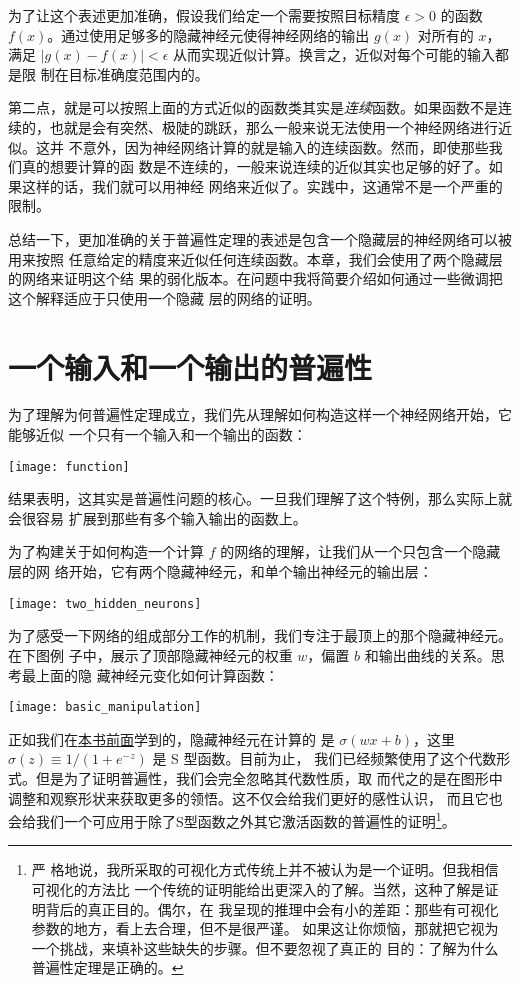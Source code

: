 为了让这个表述更加准确，假设我们给定一个需要按照目标精度 $\epsilon > 0$ 的函数
$f(x)$。通过使用足够多的隐藏神经元使得神经网络的输出 $g(x)$ 对所有的 $x$，满足
$|g(x) - f(x)| < \epsilon$ 从而实现近似计算。换言之，近似对每个可能的输入都是限
制在目标准确度范围内的。

第二点，就是可以按照上面的方式近似的函数类其实是\emph{连续}函数。如果函数不是连
续的，也就是会有突然、极陡的跳跃，那么一般来说无法使用一个神经网络进行近似。这并
不意外，因为神经网络计算的就是输入的连续函数。然而，即使那些我们真的想要计算的函
数是不连续的，一般来说连续的近似其实也足够的好了。如果这样的话，我们就可以用神经
网络来近似了。实践中，这通常不是一个严重的限制。

总结一下，更加准确的关于普遍性定理的表述是包含一个隐藏层的神经网络可以被用来按照
任意给定的精度来近似任何连续函数。本章，我们会使用了两个隐藏层的网络来证明这个结
果的弱化版本。在问题中我将简要介绍如何通过一些微调把这个解释适应于只使用一个隐藏
层的网络的证明。

\section{一个输入和一个输出的普遍性}
\label{sec:universality_with_one_input_and_one_output}

为了理解为何普遍性定理成立，我们先从理解如何构造这样一个神经网络开始，它能够近似
一个只有一个输入和一个输出的函数：
\begin{center}
  \texttt{[image: function]}
\end{center}

结果表明，这其实是普遍性问题的核心。一旦我们理解了这个特例，那么实际上就会很容易
扩展到那些有多个输入输出的函数上。

为了构建关于如何构造一个计算 $f$ 的网络的理解，让我们从一个只包含一个隐藏层的网
络开始，它有两个隐藏神经元，和单个输出神经元的输出层：
\begin{center}
  \texttt{[image: two\_hidden\_neurons]}
\end{center}

为了感受一下网络的组成部分工作的机制，我们专注于最顶上的那个隐藏神经元。在下图例
子中，展示了顶部隐藏神经元的权重 $w$，偏置 $b$ 和输出曲线的关系。思考最上面的隐
藏神经元变化如何计算函数：
\begin{center}
  \texttt{[image: basic\_manipulation]}
\end{center}

正如我们在\hyperref[sec:sigmoid_neurons]{本书前面}学到的，隐藏神经元在计算的
是 $\sigma(wx + b)$，这里 $\sigma(z) \equiv 1/(1+e^{-z})$ 是 S 型函数。目前为止，
我们已经频繁使用了这个代数形式。但是为了证明普遍性，我们会完全忽略其代数性质，取
而代之的是在图形中调整和观察形状来获取更多的领悟。这不仅会给我们更好的感性认识，
而且它也会给我们一个可应用于除了S型函数之外其它激活函数的普遍性的证明\footnote{严
  格地说，我所采取的可视化方式传统上并不被认为是一个证明。但我相信可视化的方法比
  一个传统的证明能给出更深入的了解。当然，这种了解是证明背后的真正目的。偶尔，在
  我呈现的推理中会有小的差距：那些有可视化参数的地方，看上去合理，但不是很严谨。
  如果这让你烦恼，那就把它视为一个挑战，来填补这些缺失的步骤。但不要忽视了真正的
  目的：了解为什么普遍性定理是正确的。}。


